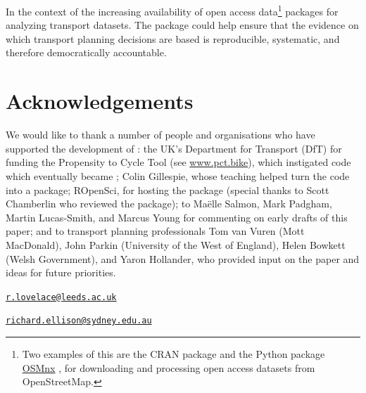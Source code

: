 %
In the context of the increasing availability of open access data\footnote{Two
examples of this are the  CRAN package \citep{Padgham2017} and the Python package
\href{https://github.com/gboeing/osmnx}{OSMnx} \citep{boeing_osmnx:_2017}, for downloading and processing
open access datasets from OpenStreetMap.}
packages for analyzing transport datasets. The  package could help
ensure that the
evidence on which transport planning decisions are based is reproducible,
systematic, and therefore democratically accountable.

\section{Acknowledgements}

We would like to thank a number of people and organisations who have supported the development of :
the UK's Department for Transport (DfT) for funding the Propensity to Cycle Tool (see \href{http://www.pct.bike/}{www.pct.bike}),
which instigated code which eventually became ;
Colin Gillespie, whose teaching helped turn the code into a package;
ROpenSci, for hosting the package (special thanks to Scott Chamberlin who reviewed the package);
to Ma{\"e}lle Salmon, Mark Padgham, Martin Lucas-Smith, and Marcus Young for commenting on early drafts of this paper;
and to transport planning professionals Tom van Vuren (Mott MacDonald), John Parkin (University of the West of England), Helen Bowkett (Welsh Government), and Yaron Hollander, who provided input on the paper and ideas for future priorities.



\address{%
Robin Lovelace\\
University of Leeds\\
Leeds Institute for Transport Studies\\
Leeds Institute for Data Analytics\\
34-40 University Road\\ LS2 9JT, UK\\
}
\href{mailto:r.lovelace@leeds.ac.uk}{\nolinkurl{r.lovelace@leeds.ac.uk}}

\address{%
Richard Ellison\\
University of Sydney\\
378 Abercrombie Street\\ Darlington, NSW 2008, Australia\\
}
\href{mailto:richard.ellison@sydney.edu.au}{\nolinkurl{richard.ellison@sydney.edu.au}}
